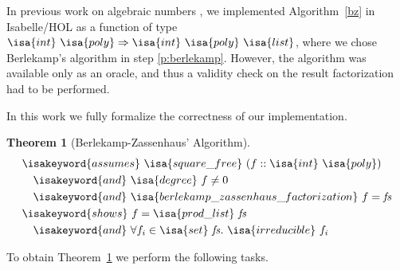 \documentclass[11pt,a4paper]{article}
\newcommand\tint{\isa{int}}
\newcommand\tlist{\isa{list}}
\newcommand\tpoly{\isa{poly}}
\newcommand\tto{\Rightarrow}
\newcommand\sqfree{\isa{square\_free}\xspace}
\newcommand\assumes{\isakeyword{assumes}\xspace}
\newcommand\idegree{\isa{degree}}
\newcommand\iand{\isakeyword{and}\xspace}
\newcommand\shows{\isakeyword{shows}}
\newcommand\bz{\isa{berlekamp\_zassenhaus\_factorization}\xspace}
\newcommand\fs{\mathit{fs}}
\newcommand\listprod{\isa{prod\_list}}
\newcommand\set{\isa{set}}
\newcommand\irred{\isa{irreducible}}
\newcommand\rTH[1]{Theorem~\ref{#1}}
\newtheorem{theorem}{Theorem}
\begin{document}
In previous work on algebraic numbers \cite{TY16}, we implemented
Algorithm~\ref{bz} in Isabelle/HOL \cite{Isabelle} as a 
function of type $\tint\ \tpoly \tto \tint\ \tpoly\ \tlist$,
where we chose Berlekamp's algorithm in step \ref{p:berlekamp}.
However, the algorithm was available only as an oracle,
and thus a validity check on the result factorization had to be performed.

In this work we fully formalize the correctness of our implementation.

\begin{theorem}[Berlekamp-Zassenhaus' Algorithm]
\label{thm:bz}
\begin{align*}
& \assumes\ \sqfree\ (f :: \tint\ \tpoly) \\
& \quad\iand\ \idegree\ f \neq 0 \\
& \quad\iand\ \bz\ f = \fs \\
& \shows\ f = \listprod\ \fs\ \\
& \quad\iand\ \forall f_i \in \set\ \fs.\ \irred\ f_i
\end{align*}
\end{theorem}

%
% 
%

To obtain \rTH{thm:bz} we perform the following tasks.
\end{document}
